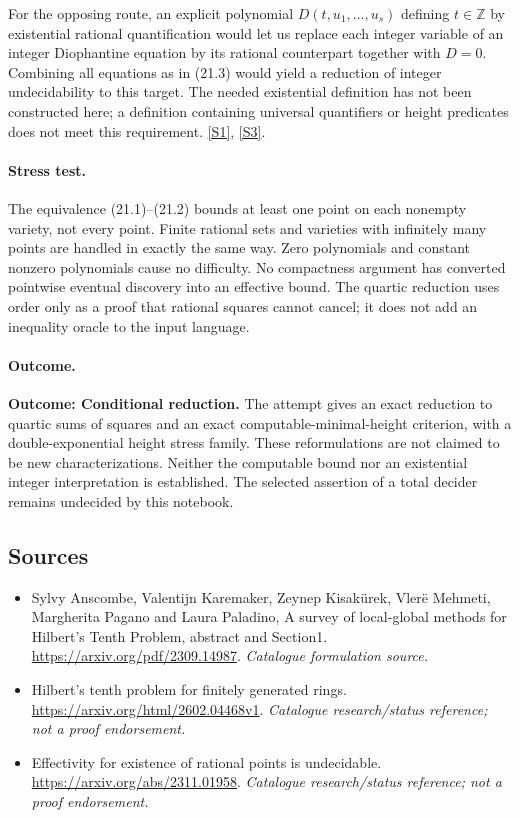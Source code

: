 \documentclass[11pt,a4paper]{article}
\newcommand{\Z}{\mathbb{Z}}
\newcommand{\sref}[2]{\hyperlink{source:#1:#2}{[S#2]}}
\begin{document}
For the opposing route, an explicit polynomial
$D(t,u_1,\ldots,u_s)$ defining $t\in\Z$ by existential rational
quantification would let us replace each integer variable of an integer
Diophantine equation by its rational counterpart together with $D=0$.
Combining all equations as in (21.3) would yield a reduction of integer
undecidability to this target. The needed existential definition has not
been constructed here; a definition containing universal quantifiers or
height predicates does not meet this requirement. \sref{statement}{1},
\sref{statement}{3}.

\paragraph{Stress test.}
The equivalence (21.1)--(21.2) bounds at least one point on each nonempty
variety, not every point. Finite rational sets and varieties with
infinitely many points are handled in exactly the same way. Zero
polynomials and constant nonzero polynomials cause no difficulty.
No compactness argument has converted pointwise eventual discovery into
an effective bound. The quartic reduction uses order only as a proof
that rational squares cannot cancel; it does not add an inequality
oracle to the input language.

\paragraph{Outcome.}
\textbf{Outcome: Conditional reduction.}
The attempt gives an exact reduction to quartic sums of squares and an
exact computable-minimal-height criterion, with a double-exponential
height stress family. These reformulations are not claimed to be new
characterizations. Neither the computable bound nor an existential
integer interpretation is established. The selected assertion of a
total decider remains undecided by this notebook.
\subsection{Sources}
\begin{itemize}\raggedright
\item[\textnormal{[S1]}]\hypertarget{source:statement:1}{} Sylvy Anscombe, Valentijn Karemaker, Zeynep Kisakürek, Vlerë Mehmeti, Margherita Pagano and Laura Paladino, A survey of local-global methods for Hilbert's Tenth Problem, abstract and Section1.
\url{https://arxiv.org/pdf/2309.14987}.
{\small\textit{Catalogue formulation source.}}
\item[\textnormal{[S2]}]\hypertarget{source:statement:2}{} Hilbert's tenth problem for finitely generated rings.
\url{https://arxiv.org/html/2602.04468v1}.
{\small\textit{Catalogue research/status reference; not a proof endorsement.}}
\item[\textnormal{[S3]}]\hypertarget{source:statement:3}{} Effectivity for existence of rational points is undecidable.
\url{https://arxiv.org/abs/2311.01958}.
{\small\textit{Catalogue research/status reference; not a proof endorsement.}}
\end{itemize}

\end{document}
